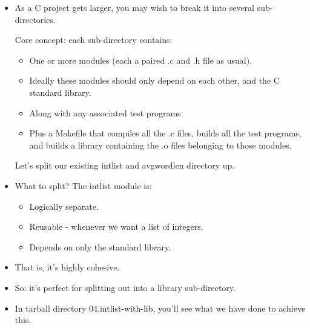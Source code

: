\documentclass[handout]{beamer}
\begin{document}
\begin{frame}[fragile]
\begin{itemize}
  \item
  As a C project gets larger, you may wish to break it into several
  sub-directories.

  \pitem
  Core concept: each sub-directory contains:
  \begin{itemize}
    \item
    One or more \alert{modules} (each a paired .c and .h file as usual).
    \item
    Ideally these modules should only depend on each other, and
    the C standard library.
    \item
    Along with any associated test programs.
    \item
    Plus a Makefile that compiles all the .c files, builds all the test
    programs, and builds a \alert{library} containing the \alert{.o}
    files belonging to those modules.
  \end{itemize}

  \pitem
  Let's split our existing intlist and avgwordlen directory up.

  \item
  What to split?
  \pause
  The intlist module is:
    \begin{itemize}
    \item
    Logically separate.
    \item
    Reusable - whenever we want a list of integers.
    \item
    Depends on only the standard library.
    \end{itemize}

  \item
  That is, it's \alert{highly cohesive}.

  \item
  So: it's perfect for splitting out into a library sub-directory.

  \item
  In tarball directory \alert{04.intlist-with-lib}, you'll see
  what we have done to achieve this.

\end{itemize}
\end{frame}
\end{document}
